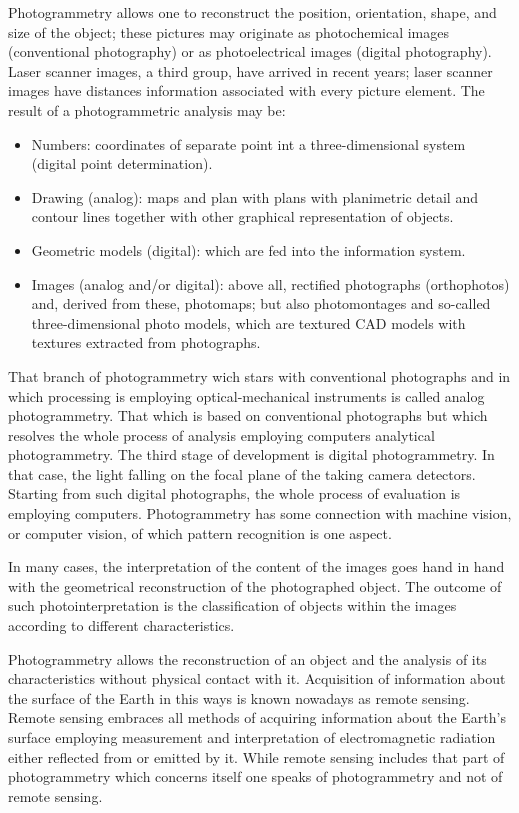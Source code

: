 Photogrammetry allows one to reconstruct the position, orientation, shape, and size of the object; these pictures may originate as photochemical images (conventional photography) or as photoelectrical images (digital photography). Laser scanner images, a third group, have arrived in recent years; laser scanner images have distances information associated with every picture element. The result of a photogrammetric analysis may be:\cite{Kraus}
\begin{itemize}
    \item Numbers: coordinates of separate point int a three-dimensional system (digital point determination).
    \item Drawing (analog):  maps and plan with plans with planimetric detail and contour lines together with other graphical representation of objects.
    \item Geometric models (digital): which are fed into the information system.
    \item Images (analog and/or digital): above all, rectified photographs (orthophotos) and, derived from these, photomaps; but also photomontages and so-called three-dimensional photo models, which are textured CAD models with textures extracted from photographs.
\end{itemize}
That branch of photogrammetry wich stars with conventional photographs and in which processing is employing optical-mechanical instruments is called analog photogrammetry. That which is based on conventional photographs but which resolves the whole process of analysis employing computers analytical photogrammetry. The third stage of development is digital photogrammetry. In that case, the light falling on the focal plane of the taking camera detectors. Starting from such digital photographs, the whole process of evaluation is employing computers. Photogrammetry has some connection with machine vision, or computer vision, of which pattern recognition is one aspect.\cite{Kraus} 

In many cases, the interpretation of the content of the images goes hand in hand with the geometrical reconstruction of the photographed object. The outcome of such photointerpretation is the classification of objects within the images according to different characteristics.\cite{Kraus}

Photogrammetry allows the reconstruction of an object and the analysis of its characteristics without physical contact with it. Acquisition of information about the surface of the Earth in this ways is known nowadays as remote sensing. Remote sensing embraces all methods of acquiring information about the Earth's surface employing measurement and interpretation of electromagnetic radiation either reflected from or emitted by it. While remote sensing includes that part of photogrammetry which concerns itself one speaks of photogrammetry and not of remote sensing. \cite{Kraus}


